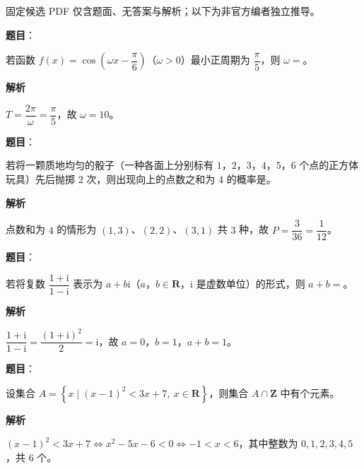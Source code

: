 

\begin{gktip}
固定候选 PDF 仅含题面、无答案与解析；以下为非官方编者独立推导。
\end{gktip}

\begin{answer}

\textbf{题目}：

若函数 $f(x)=\cos\left(\omega x-\dfrac{\pi}6\right)$（$\omega>0$）最小正周期为 $\dfrac{\pi}5$，则 $\omega=$\gkblank{}。

\textbf{解析}

$T=\dfrac{2\pi}\omega=\dfrac{\pi}5$，故 $\omega=10$。


\end{answer}
\begin{answer}

\textbf{题目}：

若将一颗质地均匀的骰子（一种各面上分别标有 $1$，$2$，$3$，$4$，$5$，$6$ 个点的正方体玩具）先后抛掷 $2$ 次，则出现向上的点数之和为 $4$ 的概率是\gkblank{}。

\textbf{解析}

点数和为 $4$ 的情形为 $(1,3)$、$(2,2)$、$(3,1)$ 共 $3$ 种，故 $P=\dfrac3{36}=\dfrac1{12}$。


\end{answer}
\begin{answer}

\textbf{题目}：

若将复数 $\dfrac{1+\mathrm i}{1-\mathrm i}$ 表示为 $a+b\mathrm i$（$a$，$b\in\mathbf R$，$\mathrm i$ 是虚数单位）的形式，则 $a+b=$\gkblank{}。

\textbf{解析}

$\dfrac{1+\mathrm i}{1-\mathrm i}=\dfrac{(1+\mathrm i)^2}2=\mathrm i$，故 $a=0$，$b=1$，$a+b=1$。


\end{answer}
\begin{answer}

\textbf{题目}：

设集合 $A=\left\{x\mid (x-1)^2<3x+7,\ x\in\mathbf R\right\}$，则集合 $A\cap\mathbf Z$ 中有\gkblank{}个元素。

\textbf{解析}

$(x-1)^2<3x+7\iff x^2-5x-6<0\iff-1<x<6$，其中整数为 $0,1,2,3,4,5$，共 $6$ 个。


\end{answer}
